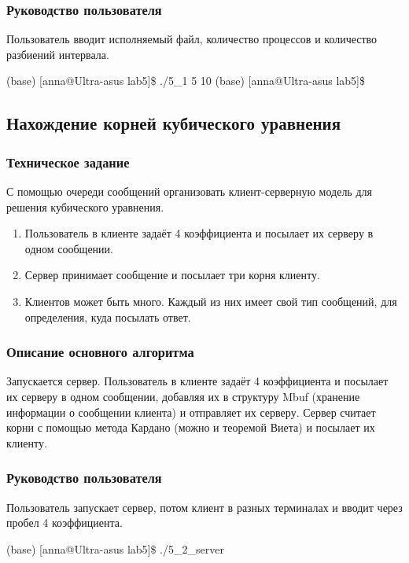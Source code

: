 \documentclass[a4paper,12pt]{extarticle}
\begin{document}
\subsubsection{Руководство пользователя}
Пользователь вводит исполняемый файл, количество процессов и количество разбиений интервала.

(base) [anna@Ultra-asus lab5]\$ ./5\_1 5 10\newline
(base) [anna@Ultra-asus lab5]\$\newline

\subsection{Нахождение корней кубического уравнения}
\subsubsection{Техническое задание}
С помощью очереди сообщений организовать клиент-серверную модель для решения кубического уравнения.
\begin{enumerate} 
  \item Пользователь в клиенте задаёт 4 коэффициента и посылает их серверу в одном сообщении.
  \item  Сервер принимает сообщение и посылает три корня клиенту.
  \item Клиентов может быть много. Каждый из них имеет свой тип сообщений, для определения, куда посылать ответ.
\end{enumerate}

\subsubsection{Описание основного алгоритма}
Запускается сервер. Пользователь в клиенте задаёт 4 коэффициента и посылает их серверу в одном сообщении, добавляя их в структуру Mbuf (хранение информации о сообщении клиента) и отправляет их серверу. Сервер считает корни с помощью метода Кардано (можно и теоремой Виета) и посылает их клиенту.

\subsubsection{Руководство пользователя}
Пользователь запускает сервер, потом клиент в разных терминалах и вводит через пробел 4 коэффициента.

(base) [anna@Ultra-asus lab5]\$ ./5\_2\_server \newline
\end{document}
